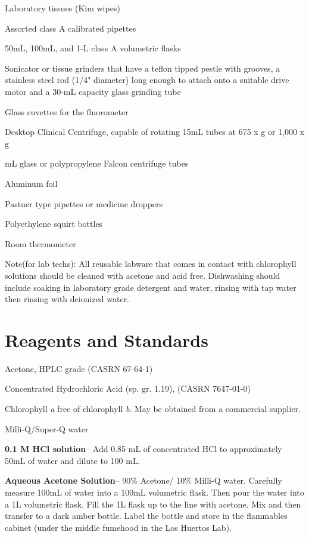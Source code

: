 \documentclass[12pt]{../SOP3}\usepackage[]{graphicx}\usepackage[]{color}
\begin{document}
\NP Laboratory tissues (Kim wipes)

\NP Assorted class A calibrated pipettes 

\NP 50mL, 100mL, and 1-L class A volumetric flasks

\NP Sonicator or tissue grinders that have a teflon tipped pestle with grooves, a stainless steel rod (1/4" diameter) long enough to attach onto a suitable drive motor and a 30-mL capacity glass grinding tube

\NP Glass cuvettes for the fluorometer

\NP Desktop Clinical Centrifuge, capable of rotating 15mL tubes at 675 x g or 1,000 x g 

 mL glass or polypropylene Falcon centrifuge tubes

\NP Aluminum foil

\NP Pastuer type pipettes or medicine droppers

\NP Polyethylene squirt bottles

\NP Room thermometer

\NP Note(for lab techs): All reusable labware that comes in contact with chlorophyll solutions should be cleaned with acetone and acid free. Dishwashing should include soaking in laboratory grade detergent and water, rinsing with tap water then rinsing with deionized water. 

\section{Reagents and Standards}
\NP Acetone, HPLC grade (CASRN 67-64-1)

\NP Concentrated Hydrochloric Acid (sp. gr. 1.19), (CASRN 7647-01-0)

\NP Chlorophyll \textit{a} free of chlorophyll \textit{b}. May be obtained from a commercial supplier.

\NP Milli-Q/Super-Q water

\NP \textbf{0.1 M HCl solution}-- Add 0.85 mL of concentrated HCl to approximately 50mL of water and dilute to 100 mL. 

\NP \textbf{Aqueous Acetone Solution}-- 90\% Acetone/ 10\% Milli-Q water. Carefully measure 100mL of water into a 100mL volumetric flask. Then pour the water into a 1L volumetric flask. Fill the 1L flask up to the line with acetone. Mix and then transfer to a dark amber bottle. Label the bottle and store in the flammables cabinet (under the middle fumehood in the Los Huertos Lab). 
\end{document}
